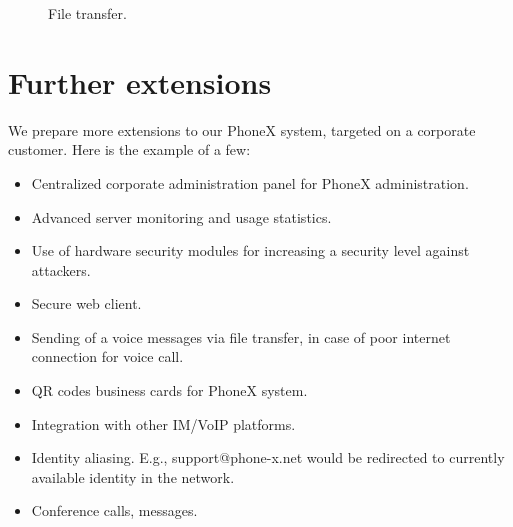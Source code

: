 \documentclass[a4paper,10pt]{article}
\begin{document}
\begin{center}
\begin{figure}[h!]
\centering
{}
\caption{File transfer.}
\label{fig:ft_transfer}
\end{figure}
\end{center}

\section{Further extensions}
We prepare more extensions to our PhoneX system, targeted on a corporate customer. Here is the example of a few:
\begin{itemize}
 \item Centralized corporate administration panel for PhoneX administration.
 \item Advanced server monitoring and usage statistics.
 \item Use of hardware security modules for increasing a security level against attackers. 
 \item Secure web client.
 \item Sending of a voice messages via file transfer, in case of poor internet connection for voice call.
 \item QR codes business cards for PhoneX system.
 \item Integration with other IM/VoIP platforms.
 \item Identity aliasing. E.g., support@phone-x.net would be redirected to currently available identity in the network.
 \item Conference calls, messages.
\end{itemize}
\end{document}
